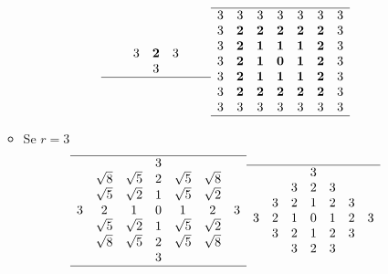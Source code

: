 \documentclass{report}
\begin{document}
\begin{itemize}
\begin{itemize}
\begin{eqnarray*}
\begin{array}[ht!]{ccccccc}
        &&3 &\textbf{2} & 3 &&\\
        &&&3&&&\\\hline
    \end{array} & \begin{array}[ht!]{ccccccc}
      \hline
      3 & 3 & 3 & 3 & 3 & 3 & 3\\
      3 & \textbf{2} & \textbf{2} & \textbf{2} & \textbf{2} & \textbf{2} & 3\\
      3 & \textbf{2} & \textbf{1} & \textbf{1} & \textbf{1} & \textbf{2} & 3\\
      3 & \textbf{2} & \textbf{1} & \textbf{0} & \textbf{1} & \textbf{2} & 3\\
      3 & \textbf{2} & \textbf{1} & \textbf{1} & \textbf{1} & \textbf{2} & 3\\
      3 & \textbf{2} & \textbf{2} & \textbf{2} & \textbf{2} & \textbf{2} & 3\\
      3 & 3 & 3 & 3 & 3 & 3 & 3\\\hline
    \end{array}
    \end{eqnarray*}
  \item Se $r=3$
    \begin{eqnarray*}
      \begin{array}[ht!]{ccccccc}
        \hline
        &&&3&&&\\
        & \sqrt{8} & \sqrt{5} & 2 & \sqrt{5} & \sqrt{8}\\
        & \sqrt{5} & \sqrt{2} & 1 & \sqrt{5} & \sqrt{2}\\
        3 & 2 & 1 & 0 & 1 & 2 & 3\\
        & \sqrt{5} & \sqrt{2} & 1 & \sqrt{5} & \sqrt{2}\\
        & \sqrt{8} & \sqrt{5} & 2 & \sqrt{5} & \sqrt{8}\\
        &&&3&&&\\\hline
      \end{array} &
                    \begin{array}[ht!]{ccccccc}
                      \hline
                      &&&3&&&\\
                      & & 3 & 2 & 3 &&\\
                      &3& 2 & 1 & 2 & 3& \\
                      3 & 2 & 1 & 0 & 1 & 2 & 3\\
                      &3& 2 & 1 & 2 &3& \\
                      &&3 & 2 & 3 &&\\

\end{array}
\end{eqnarray*}
\end{itemize}
\end{itemize}
\end{document}
